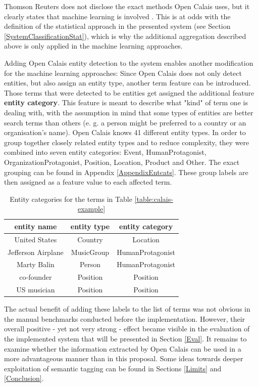 \documentclass[11pt,a4paper,twoside]{article}
\begin{document}
Thomson Reuters does not disclose the exact methods Open Calais uses, but it clearly states that machine learning is involved \cite{ThomsonReuters2018ThomsonGuide}. This is at odds with the definition of the statistical approach in the presented system (see Section \ref{SystemClassificationStat}), which is why the additional aggregation described above is only applied in the machine learning approaches.

\bigskip

Adding Open Calais entity detection to the system enables another modification for the machine learning approaches: Since Open Calais does not only detect entities, but also assign an entity type, another term feature can be introduced. Those terms that were detected to be entities get assigned the additional feature \textbf{entity category}. This feature is meant to describe what "kind" of term one is dealing with, with the assumption in mind that some types of entities are better search terms than others (e. g. a person might be preferred to a country or an organisation's name). Open Calais knows 41 different entity types. In order to group together closely related entity types and to reduce complexity, they were combined into seven entity categories: Event, HumanProtagonist, OrganizationProtagonist, Position, Location, Product and Other. The exact grouping can be found in Appendix \ref{AppendixEntcats}. These group labels are then assigned as a feature value to each affected term.

\begin{table}[b]
    \caption{Entity categories for the terms in Table \ref{table:calais-example}}
    \centering
    \begin{tabular}{|c|c|c|}
        \hline
        \textbf{entity name} & \textbf{entity type} & \textbf{entity category} \\
        \hline
        United States & Country & Location \\
        Jefferson Airplane & MusicGroup & HumanProtagonist \\
        Marty Balin & Person & HumanProtagonist \\
        co-founder & Position & Position \\
        US musician & Position & Position \\
        \hline 
    \end{tabular}
    \label{table:entcat-example}
\end{table}

The actual benefit of adding these labels to the list of terms was not obvious in the manual benchmarks conducted before the implementation. However, their overall positive - yet not very strong - effect became visible in the evaluation of the implemented system that will be presented in Section \ref{Eval}. It remains to examine whether the information extracted by Open Calais can be used in a more advantageous manner than in this proposal. Some ideas towards deeper exploitation of semantic tagging can be found in Sections \ref{Limits} and \ref{Conclusion}.
\end{document}
